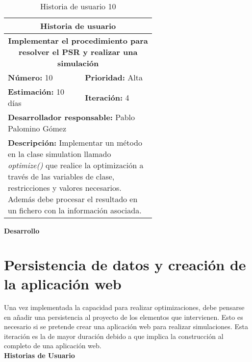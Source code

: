 \begin{table}[H]
        \centering
        \begin{tabular}{|p{0.3\linewidth}|p{0.3\linewidth}|}
          \hline
          \multicolumn{2}{|c|}{Historia de usuario}\\ \hline
          \multicolumn{2}{|c|}{\textbf{Implementar el procedimiento para resolver el PSR y realizar una simulación}}\\ \hline
          \textbf{Número:} 10 & \textbf{Prioridad:} Alta\\ \hline
          \textbf{Estimación:} 10 días & \textbf{Iteración:} 4\\ \hline
          \multicolumn{2}{|l|}{\textbf{Desarrollador responsable:} Pablo Palomino Gómez}\\ \hline
          \multicolumn{2}{|p{0.6\linewidth}|}{\textbf{Descripción:} Implementar un método en la clase simulation llamado \textit{optimize()} que realice la optimización a través de las variables de clase, restricciones y valores necesarios. Además debe procesar el resultado en un fichero con la información asociada.}\\ \hline
        \end{tabular}
        \caption{Historia de usuario 10}
        \label{tab:hist10}
\end{table}
\textbf{Desarrollo}\\


\section{Persistencia de datos y creación de la aplicación web}
\label{sec:hito5}
Una vez implementada la capacidad para realizar optimizaciones, debe pensarse en añadir una persistencia al proyecto de los elementos que intervienen. Esto es necesario si se pretende crear una aplicación web para realizar simulaciones. Esta iteración es la de mayor duración debido a que implica la construcción al completo de una aplicación web.\\

\textbf{Historias de Usuario}\\

